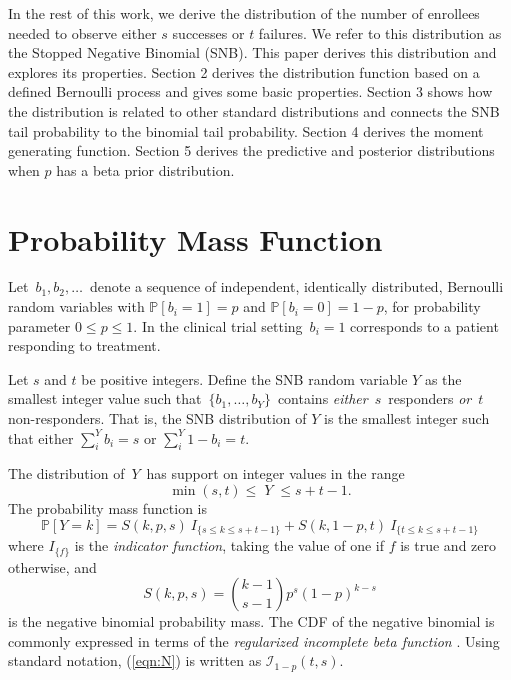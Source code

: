 \documentclass[12pt]{article}
\begin{document}
In the rest of this work, we derive the distribution of the number of 
enrollees needed
to observe either $s$ successes or $t$ failures. We refer to this distribution
as the Stopped Negative Binomial (SNB). 
This paper derives this distribution and explores its properties.
Section 2 derives the distribution function
based on a defined Bernoulli process and gives some basic properties.
Section 3 shows how the distribution is related to other standard
distributions and connects the SNB tail probability to the binomial tail 
probability.
Section 4 derives the moment generating function.
Section 5 derives the predictive and posterior distributions when $p$ has a 
beta prior distribution.

\section{Probability Mass Function}
\label{notation.section}

Let $\,b_1, b_2, \ldots \,$ denote a sequence of independent, identically
distributed, Bernoulli random variables with $\mathbb{P}[b_i=1]=p$ and
$\mathbb{P}[b_i = 0] = 1-p$, for
probability parameter $0\leq p \leq 1$. In the clinical trial setting
$\,b_i = 1$ corresponds to a patient responding to treatment.  

Let $s$ and $t$ be positive integers.  Define the SNB random
variable $Y$ as the smallest
integer value such that $\,\{b_1, \ldots , b_Y\}\,$ contains {\em either}
$\,s\,$ responders {\em or} $\,t\,$ non-responders. That is, the SNB 
distribution of $Y$ is the smallest integer such that either
$\sum_i^Y b_i = s$ or $\sum_i^Y 1-b_i = t$.

The distribution of $\,Y\,$ has support on integer values in the range
\begin{equation*}               
     \min(s,t) \leq \; Y \;\leq s+t-1  \label{range.y.eq}.
\end{equation*}
The probability mass function is
\begin{equation} \label{eqn:pmf}
\mathbb{P} [Y=k] = S(k, p, s) \ I_{\{s \leq k \leq s+t-1\}} + 
  S(k, 1-p, t) \ I_{\{ t \leq k \leq s+t-1 \}}
\end{equation}
where $I_{\{f\}}$ is the {\em indicator function}, taking the value 
of one if $f$ is true and zero otherwise, and
\begin{equation} \label{eqn:N}
S(k, p, s) = {k-1 \choose s-1} p^s (1-p)^{k-s} 
\end{equation}
is the negative binomial probability mass. 
The CDF of the negative binomial is commonly expressed in terms of the
{\em regularized incomplete beta function} \citep{Olver2010}. Using standard
notation, (\ref{eqn:N}) is written as $\mathcal{I}_{1-p}(t, s)$.
\end{document}
